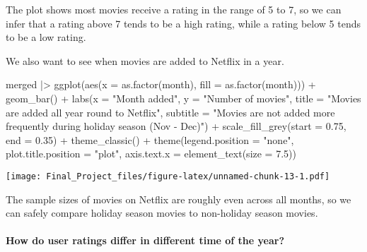 \documentclass[
]{article}
\newenvironment{Shaded}{\begin{snugshade}}{\end{snugshade}}
\newcommand{\AttributeTok}[1]{\textcolor[rgb]{0.77,0.63,0.00}{#1}}
\newcommand{\FloatTok}[1]{\textcolor[rgb]{0.00,0.00,0.81}{#1}}
\newcommand{\FunctionTok}[1]{\textcolor[rgb]{0.00,0.00,0.00}{#1}}
\newcommand{\NormalTok}[1]{#1}
\newcommand{\SpecialCharTok}[1]{\textcolor[rgb]{0.00,0.00,0.00}{#1}}
\newcommand{\StringTok}[1]{\textcolor[rgb]{0.31,0.60,0.02}{#1}}
\begin{document}
The plot shows most movies receive a rating in the range of 5 to 7, so
we can infer that a rating above 7 tends to be a high rating, while a
rating below 5 tends to be a low rating.

We also want to see when movies are added to Netflix in a year.

\begin{Shaded}
\begin{Highlighting}[]
\NormalTok{merged }\SpecialCharTok{|\textgreater{}}
  \FunctionTok{ggplot}\NormalTok{(}\FunctionTok{aes}\NormalTok{(}\AttributeTok{x =} \FunctionTok{as.factor}\NormalTok{(month), }\AttributeTok{fill =} \FunctionTok{as.factor}\NormalTok{(month))) }\SpecialCharTok{+}
  \FunctionTok{geom\_bar}\NormalTok{() }\SpecialCharTok{+}
  \FunctionTok{labs}\NormalTok{(}\AttributeTok{x =} \StringTok{"Month added"}\NormalTok{,}
       \AttributeTok{y =} \StringTok{"Number of movies"}\NormalTok{,}
       \AttributeTok{title =} \StringTok{"Movies are added all year round to Netflix"}\NormalTok{,}
       \AttributeTok{subtitle =} \StringTok{"Movies are not added more frequently during holiday season (Nov {-} Dec)"}\NormalTok{) }\SpecialCharTok{+}
  \FunctionTok{scale\_fill\_grey}\NormalTok{(}\AttributeTok{start =} \FloatTok{0.75}\NormalTok{, }\AttributeTok{end =} \FloatTok{0.35}\NormalTok{) }\SpecialCharTok{+}
  \FunctionTok{theme\_classic}\NormalTok{() }\SpecialCharTok{+}
  \FunctionTok{theme}\NormalTok{(}\AttributeTok{legend.position =} \StringTok{"none"}\NormalTok{,}
        \AttributeTok{plot.title.position =} \StringTok{"plot"}\NormalTok{,}
        \AttributeTok{axis.text.x =} \FunctionTok{element\_text}\NormalTok{(}\AttributeTok{size =} \FloatTok{7.5}\NormalTok{))}
\end{Highlighting}
\end{Shaded}

\texttt{[image: Final\_Project\_files/figure-latex/unnamed-chunk-13-1.pdf]}

The sample sizes of movies on Netflix are roughly even across all
months, so we can safely compare holiday season movies to non-holiday
season movies.

\hypertarget{how-do-user-ratings-differ-in-different-time-of-the-year}{%
\paragraph{How do user ratings differ in different time of the
year?}\label{how-do-user-ratings-differ-in-different-time-of-the-year}}
\end{document}

